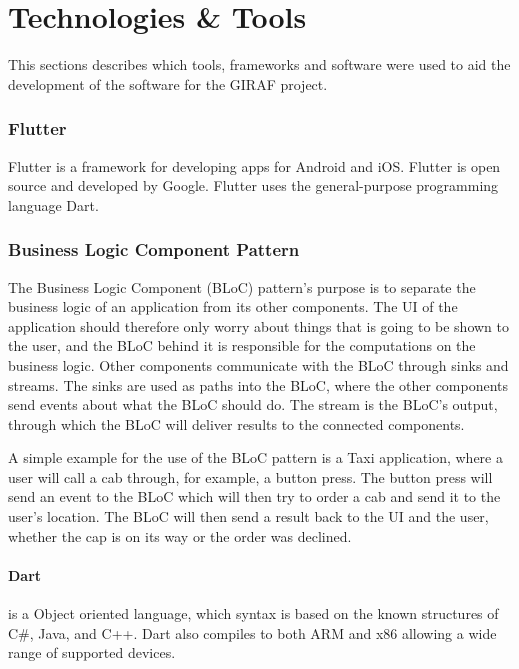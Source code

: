 \section{Technologies \& Tools} 

This sections describes which tools, frameworks and software were used to aid the development of the software for the GIRAF project. 

\subsubsection{Flutter}
Flutter is a framework for developing apps for Android and iOS. Flutter is open source and developed by Google. Flutter uses the general-purpose programming language Dart. \citep{cite:Flutter}

\subsubsection{Business Logic Component Pattern}
The Business Logic Component (BLoC) pattern's purpose is to separate the business logic of an application from its other components. The UI of the application should therefore only worry about things that is going to be shown to the user, and the BLoC behind it is responsible for the computations on the business logic. Other components communicate with the BLoC through sinks and streams. The sinks are used as paths into the BLoC, where the other components send events about what the BLoC should do. The stream is the BLoC's output, through which the BLoC will deliver results to the connected components. \citep{cite:blocPattern} 

A simple example for the use of the BLoC pattern is a Taxi application, where a user will call a cab through, for example, a button press. The button press will send an event to the BLoC which will then try to order a cab and send it to the user's location. The BLoC will then send a result back to the UI and the user, whether the cap is on its way or the order was declined.

\paragraph{Dart} is a Object oriented language, which syntax is based on the known structures of C\#, Java, and C++. Dart also compiles to both ARM and x86 allowing a wide range of supported devices. \citep{cite:DartLang}

